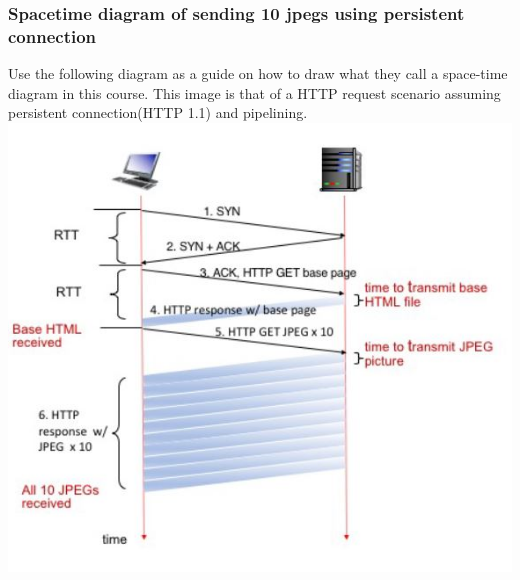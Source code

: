 \documentclass{article}
\begin{document}
\subsubsection{Spacetime diagram of sending 10 jpegs using persistent connection}
Use the following diagram as a guide on how to draw what they call a space-time diagram in this course. This image is that of a HTTP request scenario assuming persistent connection(HTTP 1.1) and pipelining.
\includegraphics{Syn+AckSpacetimediagram.JPG}
\end{document}
